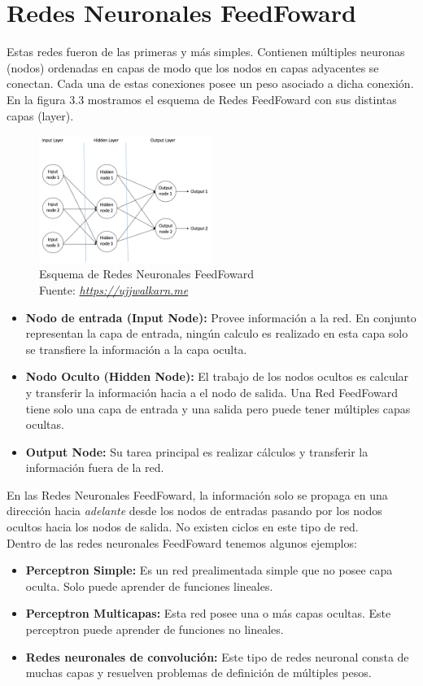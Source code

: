 \section{Redes Neuronales FeedFoward}
Estas redes fueron de las primeras y más simples. Contienen múltiples neuronas (nodos) ordenadas en capas de modo que los nodos en capas adyacentes se conectan. Cada una de estas conexiones posee un peso asociado a dicha conexión.\\
En la figura 3.3 mostramos el esquema de Redes FeedFoward con sus distintas capas (layer).
\begin{figure}[H]
	\centering
	\includegraphics[width=0.5\textwidth]{Figures/esquemaff.png}
	\caption{Esquema de Redes Neuronales FeedFoward \\ Fuente:  \href{https://ujjwalkarn.me/2016/08/09/quick-intro-neural-networks/}{\textit{https://ujjwalkarn.me}}}
	\label{neuronasredes}
\end{figure} 
\begin{itemize}
	\item \textbf{Nodo de entrada (Input Node):} Provee información a la red. En conjunto representan la capa de entrada, ningún calculo es realizado en esta capa solo se transfiere la información a la capa oculta.
	\item \textbf{Nodo Oculto (Hidden Node):} El trabajo de los nodos ocultos es calcular y transferir la información hacia a el nodo de salida. Una Red FeedFoward tiene solo una capa de entrada y una salida pero puede tener múltiples capas ocultas.
	\item \textbf{Output Node:} Su tarea principal es realizar cálculos y transferir la información fuera de la red.
\end{itemize}
En las Redes Neuronales FeedFoward, la información solo se propaga en una dirección hacia \textit{adelante} desde los nodos de entradas pasando por los nodos ocultos hacia los nodos de salida. No existen ciclos en este tipo de red.\\
Dentro de las redes neuronales FeedFoward tenemos algunos ejemplos:
\begin{itemize}
	\item \textbf{Perceptron Simple:} Es un red prealimentada simple que no posee capa oculta. Solo puede aprender de funciones lineales.
	\item \textbf{Perceptron Multicapas:} Esta red posee una o más capas ocultas. Este perceptron puede aprender de funciones no lineales.
	\item \textbf{Redes neuronales de convolución:} Este tipo de redes neuronal consta de muchas capas y resuelven problemas de definición de múltiples pesos.
\end{itemize}
